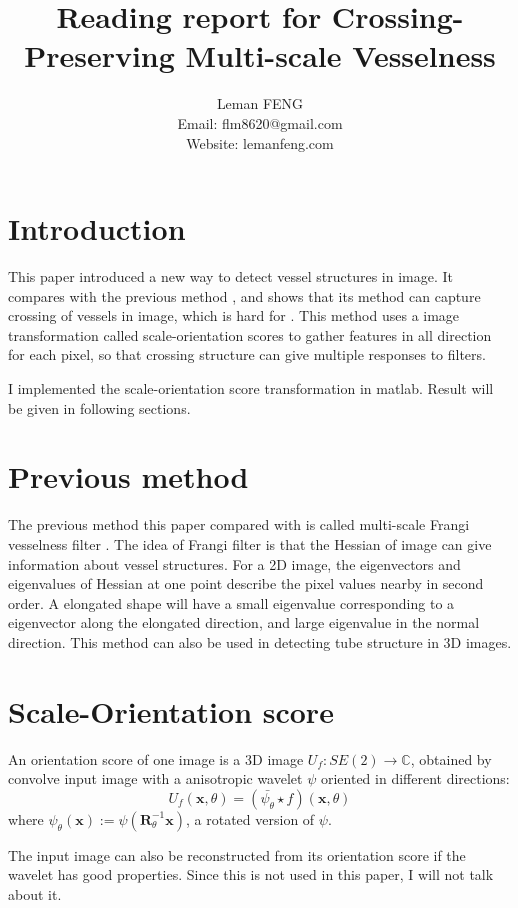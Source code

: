 \documentclass{article}
\title{Reading report for Crossing-Preserving Multi-scale Vesselness}
\author{Leman FENG\\ Email: flm8620@gmail.com\\Website: lemanfeng.com}
\begin{document}
	\maketitle
	\section{Introduction}
	This paper \cite{hannink2014crossing} introduced a new way to detect vessel structures in image. It compares with the previous method \cite{frangi1998multiscale}, and shows that its method can capture crossing of vessels in image, which is hard for \cite{frangi1998multiscale}. This method uses a image transformation called scale-orientation scores to gather features in all direction for each pixel, so that crossing structure can give multiple responses to filters.
	
	I implemented the scale-orientation score transformation in matlab. Result will be given in following sections.
	
	\section{Previous method}
	The previous method this paper compared with is called multi-scale Frangi vesselness filter \cite{frangi1998multiscale}. The idea of Frangi filter is that the Hessian of image can give information about vessel structures. For a 2D image, the eigenvectors and eigenvalues of Hessian at one point describe the pixel values nearby in second order. A elongated shape will have a small eigenvalue corresponding to a eigenvector along the elongated direction, and large eigenvalue in the normal direction. This method can also be used in detecting tube structure in 3D images.
	
	\section{Scale-Orientation score}
	An orientation score of one image is a 3D image $U_f:SE(2)\rightarrow\mathbb{C}$, obtained by convolve input image with a anisotropic wavelet $\psi$ oriented in different directions:
	\begin{equation}
	U_f(\mathbf{x},\theta) = (\bar{\psi_\theta} \star f)(\mathbf{x},\theta)
	\end{equation}
	where $\psi_\theta(\mathbf{x}):=\psi(\mathbf{R}_\theta^{-1} \mathbf{x})$, a rotated version of $\psi$.
	
	The input image can also be reconstructed from its orientation score if the wavelet has good properties. Since this is not used in this paper, I will not talk about it.
	
\end{document}
